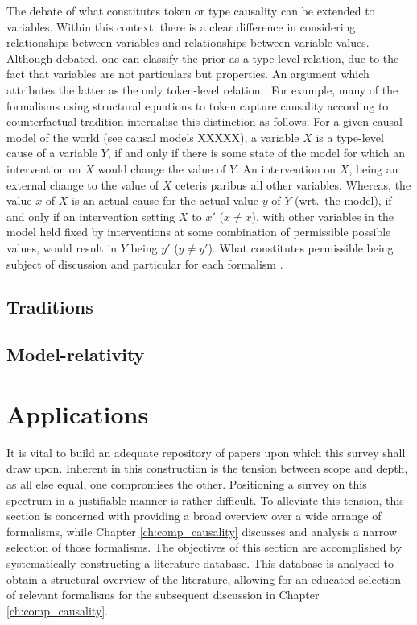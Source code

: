 \documentclass[11pt,a4paper]{book}
\theoremstyle{definition}
\theoremstyle{definition}
\theoremstyle{definition}
\theoremstyle{remark}
\begin{document}
The debate of what constitutes token or type causality can be extended to variables. Within this context, there is a clear difference in considering relationships between variables and relationships between variable values.
Although debated, one can classify the prior as a type-level relation, due to the fact that variables are not particulars but properties. An argument which attributes the latter as the only token-level relation \cite{hausman2005causal}.
For example, many of the formalisms using structural equations to token capture causality according to counterfactual tradition internalise this distinction as follows.
For a given causal model of the world (see causal models XXXXX), a variable $X$ is a type-level cause of a variable $Y$, if and only if there is some state of the model for which an intervention on $X$ would change the value of $Y$. An intervention on $X$, being an external change to the value of $X$ ceteris paribus all other variables. 
Whereas, the value $x$ of $X$ is an actual cause for the actual value $y$ of $Y$ (wrt.\ the model), if and only if an intervention setting $X$ to $x'$ ($x \neq x$), with other variables in the model held fixed by interventions at some combination of permissible possible values, would result in $Y$ being $y'$ ($y\neq y'$). What constitutes permissible being subject of discussion and particular for each formalism \cite{Weslake2015partialtheory}.



\subsection{Traditions}


\subsection{Model-relativity}





\section{Applications}







It is vital to build an adequate repository of papers upon which this survey shall draw upon. Inherent in this construction is the tension between scope and depth, as all else equal, one compromises the other. Positioning a survey on this spectrum in a justifiable manner is rather difficult. To alleviate this tension, this section is concerned with providing a broad overview over a wide arrange of formalisms, while Chapter \ref{ch:comp_causality} discusses and analysis a narrow selection of those formalisms. The objectives of this section are accomplished by systematically constructing a literature database.
This database is analysed to obtain a structural overview of the literature, allowing for an educated selection of relevant formalisms for the subsequent discussion in Chapter \ref{ch:comp_causality}.
\end{document}
